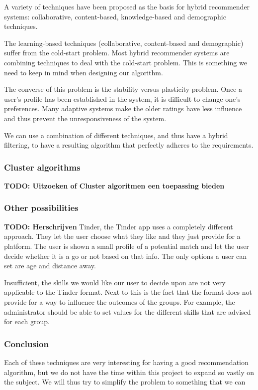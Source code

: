 \documentclass[]{article}
\newcommand{\TODO}[1]{{\color{red}\textbf{TODO: #1}}}
\begin{document}
A variety of techniques have been proposed as the basis for hybrid recommender systems: collaborative, content-based, knowledge-based and demographic techniques.

The learning-based techniques (collaborative, content-based and demographic) suffer from the cold-start problem.
Most hybrid recommender systems are combining techniques to deal with the cold-start problem.
This is something we need to keep in mind when designing our algorithm.

The converse of this problem is the stability versus plasticity problem.
Once a user's profile has been established in the system, it is difficult to change one's preferences.
Many adaptive systems make the older ratings have less influence and thus prevent the unresponsiveness of the system.

We can use a combination of different techniques, and thus have a hybrid filtering, to have a resulting algorithm that perfectly adheres to the requirements.

\subsubsection{Cluster algorithms}
\TODO{Uitzoeken of Cluster algoritmen een toepassing bieden}

\subsubsection{Other possibilities}
\TODO{Herschrijven}
Tinder, the Tinder app uses a completely different approach.
They let the user choose what they like and they just provide for a platform.
The user is shown a small profile of a potential match and let the user decide whether it is a go or not based on that info.
The only options a user can set are age and distance away.

Insufficient, the skills we would like our user to decide upon are not very applicable to the Tinder format.
Next to this is the fact that the format does not provide for a way to influence the outcomes of the groups.
For example, the administrator should be able to set values for the different skills that are advised for each group.


\subsubsection{Conclusion}

Each of these techniques are very interesting for having a good recommendation algorithm, but we do not have the time within this project to expand so vastly on the subject.
We will thus try to simplify the problem to something that we can
\end{document}
